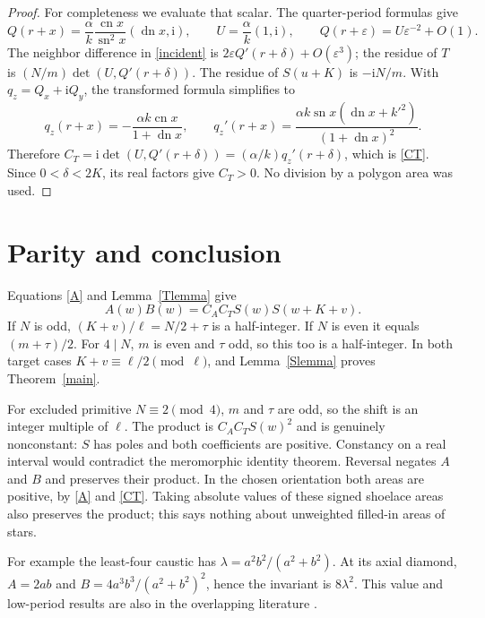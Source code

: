 \documentclass[11pt]{article}
\newcommand{\sn}{\operatorname{sn}}
\newcommand{\cn}{\operatorname{cn}}
\newcommand{\dn}{\operatorname{dn}}
\newcommand{\ii}{\mathrm i}
\begin{document}
\begin{proof}
For completeness we evaluate that scalar. The quarter-period formulas
give
\[
 Q(r+x)=\frac\alpha k\frac{\cn x}{\sn^2x}(\dn x,\ii),
 \qquad U=\frac\alpha k(1,\ii),
 \qquad Q(r+\varepsilon)=U\varepsilon^{-2}+O(1).
\]
The neighbor difference in \eqref{incident} is
$2\varepsilon Q'(r+\delta)+O(\varepsilon^3)$; the residue of
$T$ is $(N/m)\det(U,Q'(r+\delta))$. The residue of $S(u+K)$
is $-\ii N/m$. With $q_z=Q_x+\ii Q_y$, the transformed formula
simplifies to
\[
 q_z(r+x)=-\frac{\alpha k\cn x}{1+\dn x},\qquad
 q_z'(r+x)=\frac{\alpha k\sn x(\dn x+k'^2)}{(1+\dn x)^2}.
\]
Therefore $C_T=\ii\det(U,Q'(r+\delta))=(\alpha/k)q_z'(r+\delta)$,
which is \eqref{CT}. Since $0<\delta<2K$, its real factors give
$C_T>0$. No division by a polygon area was used.
\end{proof}

\section{Parity and conclusion}
Equations \eqref{A} and Lemma~\ref{Tlemma} give
\begin{equation}\label{product}
 A(w)B(w)=C_A C_T S(w)S(w+K+v).
\end{equation}
If $N$ is odd, $(K+v)/\ell=N/2+\tau$ is a half-integer.
If $N$ is even it equals $(m+\tau)/2$. For $4\mid N$, $m$ is
even and $\tau$ odd, so this too is a half-integer. In both target
cases $K+v\equiv\ell/2\pmod\ell$, and Lemma~\ref{Slemma}
proves Theorem~\ref{main}.

For excluded primitive $N\equiv2\pmod4$, $m$ and $\tau$ are
odd, so the shift is an integer multiple of $\ell$. The product is
$C_A C_T S(w)^2$ and is genuinely nonconstant: $S$ has poles and
both coefficients are positive. Constancy on a real interval would
contradict the meromorphic identity theorem. Reversal negates $A$ and
$B$ and preserves their product. In the chosen orientation both areas
are positive, by \eqref{A} and \eqref{CT}. Taking absolute values of
these signed shoelace areas also preserves the product; this says
nothing about unweighted filled-in areas of stars.

For example the least-four caustic has
$\lambda=a^2b^2/(a^2+b^2)$. At its axial diamond,
$A=2ab$ and $B=4a^3b^3/(a^2+b^2)^2$, hence the invariant is
$8\lambda^2$. This value and low-period results are also in the
overlapping literature \cite{Ferudun,FerudunGeneral}.
\end{document}
